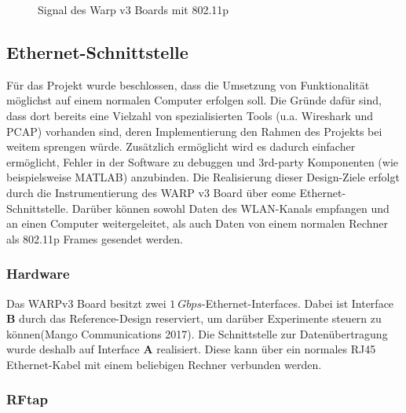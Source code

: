 \documentclass[letterpaper,11pt]{article}
\begin{document}
\begin{onehalfspace}
\begin{figure}[H]
\begin{center}
\caption{Signal des Warp v3 Boards mit 802.11p}
\label{fig7}
\end{center}
\end{figure}


\subsection{Ethernet-Schnittstelle}\label{ethernet-schnittstelle}

Für das Projekt wurde beschlossen, dass die Umsetzung von Funktionalität
möglichst auf einem normalen Computer erfolgen soll. Die Gründe dafür
sind, dass dort bereits eine Vielzahl von spezialisierten Tools (u.a.
Wireshark und PCAP) vorhanden sind, deren Implementierung den Rahmen des
Projekts bei weitem sprengen würde. Zusätzlich ermöglicht wird es
dadurch einfacher ermöglicht, Fehler in der Software zu debuggen und
3rd-party Komponenten (wie beispielsweise MATLAB) anzubinden.
Die Realisierung dieser Design-Ziele erfolgt durch die Instrumentierung
des WARP v3 Board über eome Ethernet-Schnittstelle. Darüber können
sowohl Daten des WLAN-Kanals empfangen und an einen Computer
weitergeleitet, als auch Daten von einem normalen Rechner als 802.11p
Frames gesendet werden.

\subsubsection{Hardware}\label{hardware}

Das WARPv3 Board besitzt zwei \(\SI{1}{Gbps}\)-Ethernet-Interfaces.
Dabei ist Interface \textbf{B} durch das Reference-Design reserviert, um
darüber Experimente steuern zu können(Mango Communications 2017). Die
Schnittstelle zur Datenübertragung wurde deshalb auf Interface
\textbf{A} realisiert. Diese kann über ein normales RJ45 Ethernet-Kabel
mit einem beliebigen Rechner verbunden werden.

\subsubsection{RFtap}\label{rftap}


\end{onehalfspace}
\end{document}
